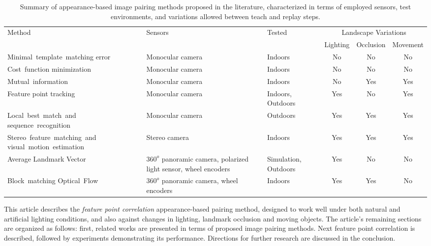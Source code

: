 \documentclass[twocolumn, 9pt,fleqn]{jsproceedings}
\begin{document}
\begin{table}[t]
\centering
\caption{Summary of appearance-based image pairing methods proposed in the literature, characterized in terms of employed sensors, test environments, and variations allowed between teach and replay steps.}
\renewcommand{\arraystretch}{1.5}
\setlength{\tabcolsep}{5pt}
\tiny
\begin{tabular}{|m{2.2cm}|m{1.4cm}|m{0.7cm}|c|c|c|}
\hline
    \multirow{2}{*}{\centering Method} & \multirow{2}{*}{Sensors} & \multirow{2}{*}{Tested} & \multicolumn{3}{|c|}{Landscape Variations} \\
\cline{4-6}
    & & & Lighting & Occlusion & Movement \\
\hline
    \mbox{Minimal template matching} \mbox{error~\cite{MAT96}} & Monocular camera & Indoors & No & No & No \\
\hline
    \mbox{Cost function} \mbox{minimization~\cite{OYA96}} & Monocular camera & Indoors & No & No & No \\
\hline
    \mbox{Mutual information~\cite{STE12}} & Monocular camera & Indoors & No & Yes & Yes \\
\hline
    Feature point tracking~\cite{CHE06} & Monocular camera & Indoors, Outdoors & Yes & No & Yes \\
\hline
    \mbox{Local best match and} \mbox{sequence recognition~\cite{MIL12}} & Monocular camera & Outdoors & Yes & Yes & Yes \\
\hline
    \mbox{Stereo feature matching and} \mbox{visual motion estimation~\cite{KIM08}} & Stereo camera & Indoors & Yes & Yes & Yes \\
\hline
    Average Landmark Vector~\cite{LAM00} & $360^o$ panoramic camera, polarized light sensor, wheel encoders & Simulation, Outdoors & Yes & No & No \\
\hline
    \mbox{Block matching} \mbox{Optical Flow~\cite{VAR05}} & $360^o$ panoramic camera, wheel encoders & Indoors & Yes & Yes & No \\
\hline
\end{tabular}
\label{tab:methods}
\end{table}

This article describes the \textit{feature point correlation} appearance-based pairing method, designed to work well under both natural and artificial lighting conditions, and also against changes in lighting, landmark occlusion and moving objects. The article's remaining sections are organized as follows: first, related works are presented in terms of proposed image pairing methods. Next feature point correlation is described, followed by experiments demonstrating its performance. Directions for further research are discussed in the conclusion.
\end{document}

